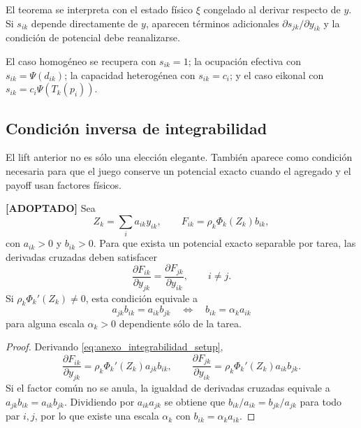 El teorema se interpreta con el estado físico $\xi$ congelado al derivar respecto de
$y$. Si $s_{ik}$ depende directamente de $y$, aparecen términos adicionales
$\partial s_{jk}/\partial y_{ik}$ y la condición de potencial debe reanalizarse.

El caso homogéneo se recupera con $s_{ik}=1$; la ocupación efectiva con
$s_{ik}=\Psi(d_{ik})$; la capacidad heterogénea con $s_{ik}=c_i$; y el caso eikonal con
$s_{ik}=c_i\Psi(T_k(p_i))$.

\subsection{Condición inversa de integrabilidad}
\label{subsec:integrabilidad-inversa}

El lift anterior no es sólo una elección elegante. También aparece como condición
necesaria para que el juego conserve un potencial exacto cuando el agregado y el payoff
usan factores físicos.

\begin{proposicion}
\textbf{[ADOPTADO]}
Sea
\begin{equation}
  Z_k=\sum_i a_{ik}y_{ik},
  \qquad
  F_{ik}=\rho_k\Phi_k(Z_k)b_{ik},
  \label{eq:anexo_integrabilidad_setup}
\end{equation}
con $a_{ik}>0$ y $b_{ik}>0$. Para que exista un potencial exacto separable por tarea,
las derivadas cruzadas deben satisfacer
\begin{equation}
  \frac{\partial F_{ik}}{\partial y_{jk}}
  =
  \frac{\partial F_{jk}}{\partial y_{ik}},
  \qquad i\ne j.
  \label{eq:anexo_derivadas_cruzadas}
\end{equation}
Si $\rho_k\Phi_k'(Z_k)\ne0$, esta condición equivale a
\begin{equation}
  a_{jk}b_{ik}=a_{ik}b_{jk}
  \quad\Longleftrightarrow\quad
  b_{ik}=\alpha_k a_{ik}
  \label{eq:anexo_condicion_integrabilidad}
\end{equation}
para alguna escala $\alpha_k>0$ dependiente sólo de la tarea.
\end{proposicion}

\begin{proof}
Derivando \eqref{eq:anexo_integrabilidad_setup},
\[
  \frac{\partial F_{ik}}{\partial y_{jk}}
  =
  \rho_k\Phi_k'(Z_k)a_{jk}b_{ik},
  \qquad
  \frac{\partial F_{jk}}{\partial y_{ik}}
  =
  \rho_k\Phi_k'(Z_k)a_{ik}b_{jk}.
\]
Si el factor común no se anula, la igualdad de derivadas cruzadas equivale a
$a_{jk}b_{ik}=a_{ik}b_{jk}$. Dividiendo por $a_{ik}a_{jk}$ se obtiene que
$b_{ik}/a_{ik}=b_{jk}/a_{jk}$ para todo par $i,j$, por lo que existe una escala
$\alpha_k$ con $b_{ik}=\alpha_ka_{ik}$.
\end{proof}

